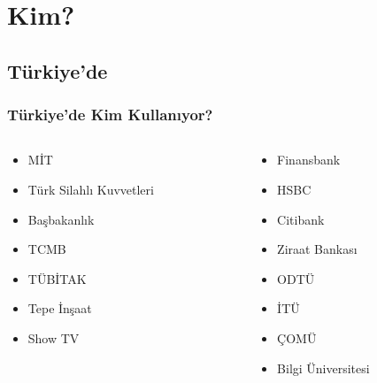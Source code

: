 \documentclass{beamer}
\begin{document}
\section{Kim?}
	\subsection{Türkiye'de}
		\begin{frame}
		 
			\frametitle{Türkiye'de Kim Kullanıyor?}
			\begin{columns}
			\begin{column}[l]{5cm}
				\begin{itemize}
					\item MİT
					\item Türk Silahlı Kuvvetleri
					\item Başbakanlık
					\item TCMB
					\item TÜBİTAK
					\item Tepe İnşaat
					\item Show TV
				\end{itemize}
			\end{column}
			\begin{column}[r]{5cm}
				\begin{itemize}
					\item Finansbank
					\item HSBC
					\item Citibank
					\item Ziraat Bankası
					\item ODTÜ
					\item İTÜ
					\item ÇOMÜ
					\item Bilgi Üniversitesi
				\end{itemize}
			\end{column}
			\end{columns}

		\end{frame}
\end{document}
